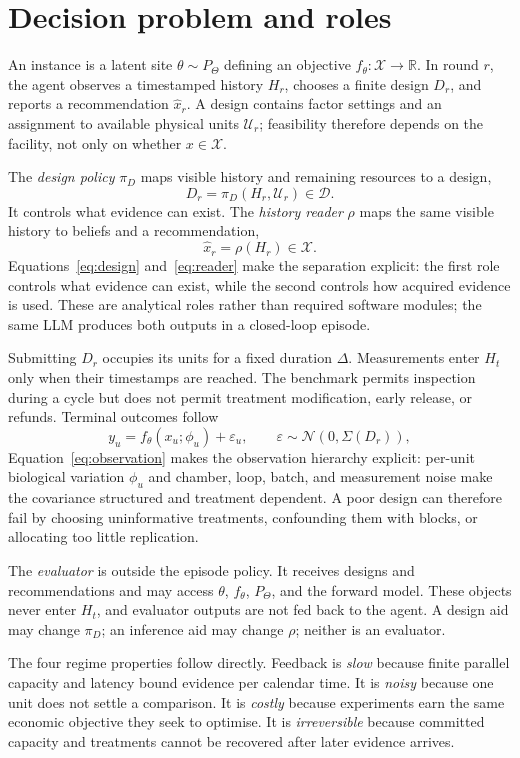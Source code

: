 \section{Decision problem and roles}
\label{sec:framework}

An instance is a latent site $\theta\sim P_\Theta$ defining an objective
$f_\theta:\mathcal X\rightarrow\mathbb R$. In round $r$, the agent observes a timestamped
history $H_r$, chooses a finite design $D_r$, and reports a recommendation $\hat x_r$. A
design contains factor settings and an assignment to available physical units
$\mathcal U_r$; feasibility therefore depends on the facility, not only on whether
$x\in\mathcal X$.

The \emph{design policy} $\pi_D$ maps visible history and remaining resources to a design,
\begin{equation}
 D_r=\pi_D(H_r,\mathcal U_r)\in\mathcal D.
 \label{eq:design}
\end{equation}
It controls what evidence can exist. The \emph{history reader} $\rho$ maps the same visible
history to beliefs and a recommendation,
\begin{equation}
 \hat x_r=\rho(H_r)\in\mathcal X.
 \label{eq:reader}
\end{equation}
Equations~\ref{eq:design} and~\ref{eq:reader} make the separation explicit: the first role controls what evidence can exist, while the second controls how acquired evidence is used. These are analytical roles rather than required software modules; the same LLM produces both outputs in a closed-loop episode.

Submitting $D_r$ occupies its units for a fixed duration $\Delta$. Measurements enter
$H_t$ only when their timestamps are reached. The benchmark permits inspection during a
cycle but does not permit treatment modification, early release, or refunds. Terminal
outcomes follow
\begin{equation}
 y_u=f_\theta(x_u;\phi_u)+\varepsilon_u,
 \qquad \varepsilon\sim\mathcal N(0,\Sigma(D_r)),
 \label{eq:observation}
\end{equation}
Equation~\ref{eq:observation} makes the observation hierarchy explicit: per-unit biological variation $\phi_u$ and chamber, loop, batch, and measurement noise make the covariance structured and treatment dependent. A poor design can therefore fail by
choosing uninformative treatments, confounding them with blocks, or allocating too little
replication.

The \emph{evaluator} is outside the episode policy. It receives designs and recommendations
and may access $\theta$, $f_\theta$, $P_\Theta$, and the forward model. These objects never
enter $H_t$, and evaluator outputs are not fed back to the agent. A design aid may change
$\pi_D$; an inference aid may change $\rho$; neither is an evaluator.

The four regime properties follow directly. Feedback is \emph{slow} because finite
parallel capacity and latency bound evidence per calendar time. It is \emph{noisy} because
one unit does not settle a comparison. It is \emph{costly} because experiments earn the
same economic objective they seek to optimise. It is \emph{irreversible} because committed
capacity and treatments cannot be recovered after later evidence arrives.

